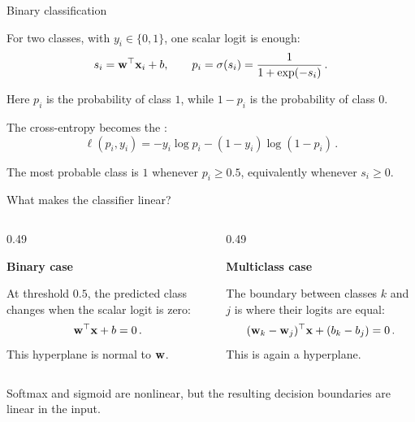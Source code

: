 \begin{frame}{Binary classification}

	\justifying
	\begin{tcolorbox}[nndsblue,boxsep=1mm,top=1mm,bottom=1mm]
		For two classes, with $y_i\in\{0,1\}$, one scalar logit is enough:
		\begin{equation}
			s_i=\boldsymbol{\mathbf{w}}^{\top}\boldsymbol{\mathbf{x}}_i+b,
			\qquad
			p_i=\sigma(s_i)=\frac{1}{1+\exp(-s_i)} \,.
		\end{equation}
	\end{tcolorbox}
	Here $p_i$ is the probability of class $1$, while $1-p_i$ is the probability of class $0$.

	\begin{tcolorbox}[nndsgreen]
		The cross-entropy becomes the :
		\begin{equation}
			\ell(p_i,y_i)
			=-y_i\log p_i-(1-y_i)\log(1-p_i) \,.
		\end{equation}
	\end{tcolorbox}

	The most probable class is $1$ whenever $p_i\geq 0.5$, equivalently whenever $s_i\geq 0$.

\end{frame}

\begin{frame}{What makes the classifier linear?}

	\footnotesize
	\begin{columns}[T,onlytextwidth]
		\begin{column}{0.49\textwidth}
			\begin{tcolorbox}[nndsblue,courseheight={linear-boundaries}{0.49\textheight}]
				\textbf{\color{darkcerulean}Binary case}

				At threshold $0.5$, the predicted class changes when the scalar logit is zero:
				\begin{equation}
					\boldsymbol{\mathbf{w}}^{\top}\boldsymbol{\mathbf{x}}+b=0 \,.
				\end{equation}
				This hyperplane is normal to $\boldsymbol{\mathbf{w}}$.
			\end{tcolorbox}
		\end{column}
		\begin{column}{0.49\textwidth}
			\begin{tcolorbox}[nndsblue,courseheight={linear-boundaries}{0.49\textheight}]
				\textbf{\color{darkcerulean}Multiclass case}

				The boundary between classes $k$ and $j$ is where their logits are equal:
				\begin{equation}
					(\boldsymbol{\mathbf{w}}_k-\boldsymbol{\mathbf{w}}_j)^{\top}\boldsymbol{\mathbf{x}}
					+(b_k-b_j)=0 \,.
				\end{equation}
				This is again a hyperplane.
			\end{tcolorbox}
		\end{column}
	\end{columns}

	\begin{tcolorbox}[nndsgreen,boxsep=1mm,top=1mm,bottom=1mm]
		Softmax and sigmoid are nonlinear, but the resulting decision boundaries are linear in the input.
	\end{tcolorbox}

\end{frame}

